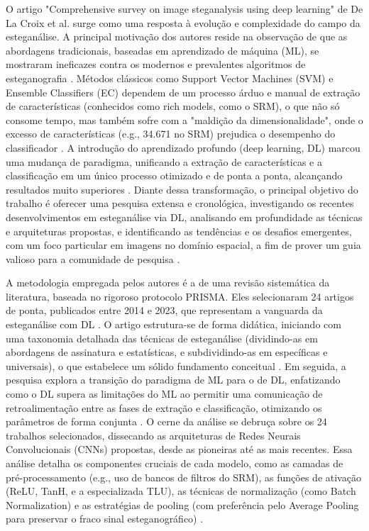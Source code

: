 \documentclass[12pt]{article}
\begin{document}
O artigo "Comprehensive survey on image steganalysis using deep learning" de De La Croix et al. surge como uma resposta à evolução e complexidade do campo da esteganálise. A principal motivação dos autores reside na observação de que as abordagens tradicionais, baseadas em aprendizado de máquina (ML), se mostraram ineficazes contra os modernos e prevalentes algoritmos de esteganografia \cite{LaCroix2024survey}. Métodos clássicos como Support Vector Machines (SVM) e Ensemble Classifiers (EC) dependem de um processo árduo e manual de extração de características (conhecidos como rich models, como o SRM), o que não só consome tempo, mas também sofre com a "maldição da dimensionalidade", onde o excesso de características (e.g., 34.671 no SRM) prejudica o desempenho do classificador \cite{LaCroix2024survey}. A introdução do aprendizado profundo (deep learning, DL) marcou uma mudança de paradigma, unificando a extração de características e a classificação em um único processo otimizado e de ponta a ponta, alcançando resultados muito superiores \cite{LaCroix2024survey}. Diante dessa transformação, o principal objetivo do trabalho é oferecer uma pesquisa extensa e cronológica, investigando os recentes desenvolvimentos em esteganálise via DL, analisando em profundidade as técnicas e arquiteturas propostas, e identificando as tendências e os desafios emergentes, com um foco particular em imagens no domínio espacial, a fim de prover um guia valioso para a comunidade de pesquisa \cite{LaCroix2024survey}.

A metodologia empregada pelos autores é a de uma revisão sistemática da literatura, baseada no rigoroso protocolo PRISMA. Eles selecionaram 24 artigos de ponta, publicados entre 2014 e 2023, que representam a vanguarda da esteganálise com DL \cite{LaCroix2024survey}. O artigo estrutura-se de forma didática, iniciando com uma taxonomia detalhada das técnicas de esteganálise (dividindo-as em abordagens de assinatura e estatísticas, e subdividindo-as em específicas e universais), o que estabelece um sólido fundamento conceitual \cite{LaCroix2024survey}. Em seguida, a pesquisa explora a transição do paradigma de ML para o de DL, enfatizando como o DL supera as limitações do ML ao permitir uma comunicação de retroalimentação entre as fases de extração e classificação, otimizando os parâmetros de forma conjunta \cite{LaCroix2024survey}. O cerne da análise se debruça sobre os 24 trabalhos selecionados, dissecando as arquiteturas de Redes Neurais Convolucionais (CNNs) propostas, desde as pioneiras até as mais recentes. Essa análise detalha os componentes cruciais de cada modelo, como as camadas de pré-processamento (e.g., uso de bancos de filtros do SRM), as funções de ativação (ReLU, TanH, e a especializada TLU), as técnicas de normalização (como Batch Normalization) e as estratégias de pooling (com preferência pelo Average Pooling para preservar o fraco sinal esteganográfico) \cite{LaCroix2024survey}.
\end{document}
